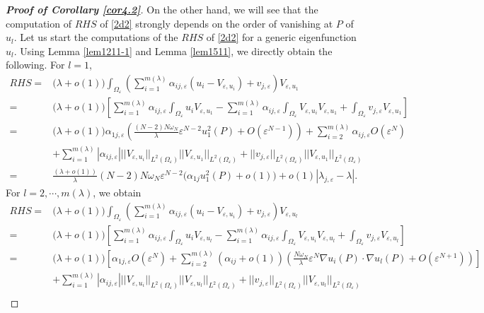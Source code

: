 \documentclass[11pt,reqno]{article}
\numberwithin{equation}{section}
\newcommand\e\varepsilon
\newcommand\la\lambda
\renewcommand\o\omega
\renewcommand\O\Omega
\begin{document}
\begin{proof}[\bf Proof of Corollary \ref{cor4.2}]
        On the other hand, we will see that the computation of $RHS$ of \eqref{2d2} strongly depends on the order of vanishing at $P$ of $u_l$. Let us start the computations of the $RHS$ of \eqref{2d2} for a generic eigenfunction $u_l$. 
        Using Lemma \ref{lem1211-1} and Lemma \ref{lem1511}, we directly obtain the following.
		For $l=1$,
		\begin{equation}\label{2d5}
			\begin{split}
				RHS=&\big(\la+o(1)\big)\int_{\O_\e}\left(\sum_{i=1}^{m(\la)}\alpha_{ij,\e} (u_i-V_{\e,u_i})+ v_{j,\e}\right)V_{\e,u_1}\\
				=&\big(\la+o(1)\big)\left[\sum_{i=1}^{m(\la)}\alpha_{ij,\e}\int_{\O_\e}u_iV_{\e,u_1}-\sum_{i=1}^{m(\la)}\alpha_{ij,\e}\int_{\O_\e}V_{\e,u_i}V_{\e,u_1}+\int_{\O_\e}v_{j,\e}V_{\e,u_1}\right]\\
                =&\big(\la+o(1)\big)\alpha_{1j,\e}\left(\frac{(N-2)N\o_N}{\lambda}\e^{N-2}u_1^2(P)+O(\e^{N-1})\right)+\sum_{i=2}^{m(\la)}\alpha_{ij,\e}O(\e^{N})\\
                & +\sum_{i=1}^{m(\la)}|\alpha_{ij,\e}|||V_{\e,u_i}||_{L^2(\O_\e)}||V_{\e,u_1}||_{L^2(\O_\e)}+||v_{j,\e}||_{L^2(\O_\e)}||V_{\e,u_1}||_{L^2(\O_\e)}\\
				=&\frac{(\la+o(1))}{\la }(N-2)N\o_N\e^{N-2}\Big(\alpha_{1j}u_1^2(P)+o(1)\Big)+o(1)|\lambda_{j,\e}-\lambda|.
			\end{split}
		\end{equation}
		For $l=2,\cdots,m(\lambda)$, we obtain 
		\begin{equation}\label{2d6}
			\begin{split}
				RHS=&\big(\la+o(1)\big)\int_{\O_\e}\left(\sum_{i=1}^{m(\la)}\alpha_{ij,\e}(u_i-V_{\e,u_i})+v_{j,\e}\right)V_{\e,u_l}\\
				=&\big(\la+o(1)\big)\left[\sum_{i=1}^{m(\la)}\alpha_{ij,\e}\int_{\O_\e}u_iV_{\e,u_l}-\sum_{i=1}^{m(\la)}\alpha_{ij,\e}\int_{\O_\e}V_{\e,u_i}V_{\e,u_l}+\int_{\O_\e}v_{j,\e}V_{\e,u_l}\right]\\
                =&\big(\la+o(1)\big)\left[\alpha_{1j,\e}O(\e^{N})+\sum_{i=2}^{m(\la)}(\alpha_{ij}+o(1))\left(\frac{N\o_N}{\lambda}\e^{N}\nabla u_i(P)\cdot\nabla u_l(P)+O(\e^{N+1})\right)\right]\\
                &+\sum_{i=1}^{m(\la)}|\alpha_{ij,\e}|||V_{\e,u_i}||_{L^2(\O_\e)}||V_{\e,u_l}||_{L^2(\O_\e)}+||v_{j,\e}||_{L^2(\O_\e)}||V_{\e,u_l}||_{L^2(\O_\e)}\\

\end{split}
\end{equation}
\end{proof}
\end{document}
